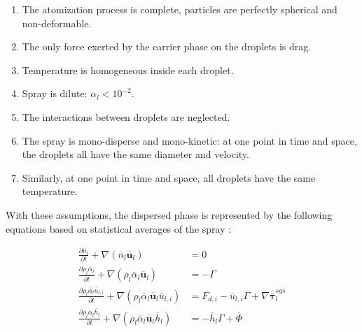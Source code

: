 \begin{enumerate}

\item The atomization process is complete, particles are perfectly spherical and non-deformable.

\item The only force exerted by the carrier phase on the droplets is drag.

\item Temperature is homogeneous inside each droplet.

\item Spray is dilute: $\alpha_l < 10^{-2}$.

\item The interactions between droplets are neglected.

\item The spray is mono-disperse and mono-kinetic: at one point in time and space, the droplets all have the same diameter and velocity.

\item Similarly, at one point in time and space, all droplets have the same temperature.


\end{enumerate}

With these assumptions, the dispersed phase is represented by the following equations based on statistical averages of the spray :

\begin{subequations}
\label{eq:EE_disperse_phase}
\begin{align}
\frac{\partial \overline{n}_l}{\partial t} + \nabla \left( \overline{n}_l \overline{\textbf{u}}_l \right)  &= 0 \\
\frac{\partial \rho_l \overline{\alpha}_l}{\partial t} + \nabla \left( \rho_l \overline{\alpha}_l \overline{\textbf{u}}_l \right) &= - \Gamma \\
\frac{\partial \rho_l \overline{\alpha}_l \overline{u}_{l,i}}{\partial t} + \nabla \left( \rho_l \overline{\alpha}_l \overline{\textbf{u}}_l \overline{u}_{l,i} \right) &= F_{d,i} - \overline{u}_{l,i} \Gamma  + \nabla \overline{\overline{\pmb{\tau}}}_l^{sgs} \\
\frac{\partial \rho_l \overline{\alpha}_l \overline{h}_l}{\partial t} + \nabla \left( \rho_l \overline{\alpha}_l \overline{\textbf{u}}_l  \overline{h}_l \right) &=  - \overline{h}_l  \Gamma + \overline{\Phi}
\end{align}
\end{subequations}

